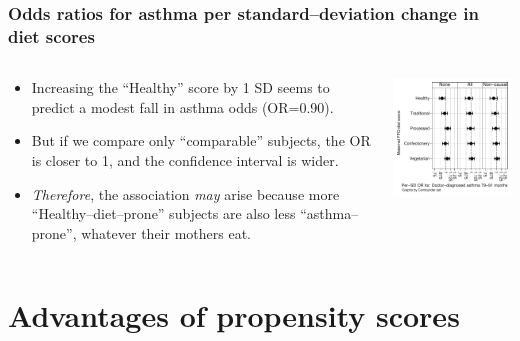 \documentclass[11pt]{beamer}
\begin{document}
\begin{frame}
\frametitle{Odds ratios for asthma per standard--deviation change in diet scores}

\begin{columns}[t]
\begin{column}{48mm}
\begin{itemize}
\item<2-> Increasing the ``Healthy'' score by 1 SD seems to predict a modest fall in asthma odds (OR=0.90).
\item<3-> But if we compare only ``comparable'' subjects, the OR is closer to 1,
and the confidence interval is wider.
\item<4-> \textit{Therefore}, the association \textit{may} arise because more
``Healthy--diet--prone'' subjects are also less ``asthma--prone'',
whatever their mothers eat.
\end{itemize}
\end{column}
\begin{column}[T]{80mm}
\includegraphics[width=76mm]{figseq1.pdf}
\end{column}
\end{columns}

\end{frame}

\section{Advantages of propensity scores}
\end{document}
